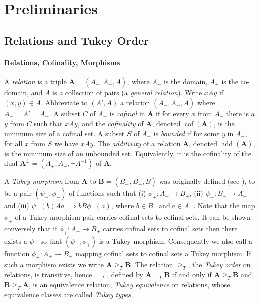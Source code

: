 \documentclass{article}
\newcommand{\gtq}{\ge_{T}}
\newcommand{\gte}{=_{T}}
\DeclareMathOperator{\cof}{cof}
\begin{document}
\section{Preliminaries}
\subsection{Relations and Tukey Order}\label{ssec:prelim_rel} 
\paragraph{Relations, Cofinality, Morphisms}
A \emph{relation} is a triple $\mathbf{A}=(A_-,A_+,A)$, where $A_-$ is the domain, $A_+$ is the co-domain, and $A$ is a collection of pairs  (a \emph{general relation}). 
Write $xAy$ if $(x,y) \in A$. 
Abbreviate to $(A',A)$  a relation $(A_-,A_+, A)$  where $A_-=A'=A_+$. 
A subset $C$ of $A_+$ is \emph{cofinal} in $\mathbf{A}$ if for every $x$ from $A_-$ there is a $y$ from $C$ such that $xAy$, and  the \emph{cofinality} of $\mathbf{A}$, denoted $\cof(\mathbf{A})$, is the minimum size of a cofinal set. 
A subset $S$ of $A_-$ is \emph{bounded} if for some $y$ in $A_+$, for all $x$ from $S$ we have $xAy$. 
The \emph{additivity} of a relation $\mathbf{A}$, denoted $\mathop{add}(\mathbf{A})$, is the minimum size of an unbounded set.  
Equivalently, it is the cofinality of the dual $\mathbf{A}^\perp=(A_+,A_-,\neg A^{-1})$ of $\mathbf{A}$.

A \emph{Tukey morphism} from $\mathbf{A}$ to $\mathbf{B}=(B_-,B_+,B)$ 
was  originally  defined (see \cite{Vojtas}), to be a pair $( \psi_-,\phi_+)$ of functions such that (i) $\phi_+: A_+ \to B_+$, (ii) $ \psi_-: B_- \to A_-$ and (iii) $\psi_-(b) A a \implies b B \phi_+(a)$, where  $b \in B_- \ \text{and}\ a \in A_+$. 
Note that the map $\phi_+$ of a Tukey morphism pair 
carries cofinal sets to cofinal sets.  
It can be shown conversely that if $\phi_+:A_+ \to B_+$  carries cofinal sets to cofinal sets then there exists a $\psi_-$ so that $(\psi_-,\phi_+)$ is a Tukey morphism. Consequently we also call a function $\phi_+:A_+ \to B_+$  mapping cofinal sets to cofinal sets a Tukey morphism. 
If such a morphism exists we write $\mathbf{A} \gtq \mathbf{B}$.  
The relation $\gtq$, the \emph{Tukey order} on relations,  is transitive, hence $\gte$, defined by $\mathbf{A} \gte \mathbf{B}$ if and only if $\mathbf{A} \gtq \mathbf{B}$ and $\mathbf{B} \gtq \mathbf{A}$, is an equivalence relation,  \emph{Tukey equivalence} on relations, whose equivalence classes are called \emph{Tukey types}.
\end{document}
